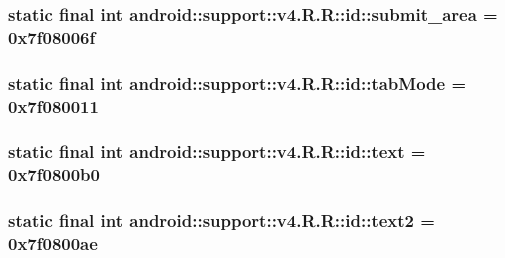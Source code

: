 \hypertarget{classandroid_1_1support_1_1v4_1_1_r_1_1id_6170f6a9736195215c478b76f8a0930e}{
\subsubsection[{submit\_\-area}]{\setlength{\rightskip}{0pt plus 5cm}static final int android::support::v4.R.R::id::submit\_\-area = 0x7f08006f}}
\label{classandroid_1_1support_1_1v4_1_1_r_1_1id_6170f6a9736195215c478b76f8a0930e}


\hypertarget{classandroid_1_1support_1_1v4_1_1_r_1_1id_10acdbba9f807d6035c40f1083955d93}{
\subsubsection[{tabMode}]{\setlength{\rightskip}{0pt plus 5cm}static final int android::support::v4.R.R::id::tabMode = 0x7f080011}}
\label{classandroid_1_1support_1_1v4_1_1_r_1_1id_10acdbba9f807d6035c40f1083955d93}


\hypertarget{classandroid_1_1support_1_1v4_1_1_r_1_1id_5ee622676e61de7f0e2ddf82a34f05fe}{
\subsubsection[{text}]{\setlength{\rightskip}{0pt plus 5cm}static final int android::support::v4.R.R::id::text = 0x7f0800b0}}
\label{classandroid_1_1support_1_1v4_1_1_r_1_1id_5ee622676e61de7f0e2ddf82a34f05fe}


\hypertarget{classandroid_1_1support_1_1v4_1_1_r_1_1id_22d6716722ec7ad0cc063a05276d2b64}{
\subsubsection[{text2}]{\setlength{\rightskip}{0pt plus 5cm}static final int android::support::v4.R.R::id::text2 = 0x7f0800ae}}
\label{classandroid_1_1support_1_1v4_1_1_r_1_1id_22d6716722ec7ad0cc063a05276d2b64}


